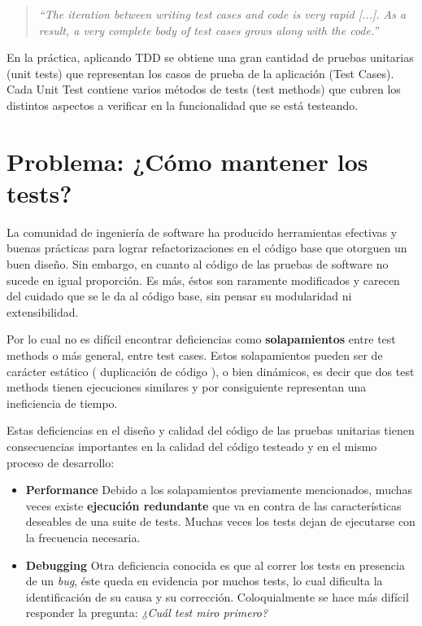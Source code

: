 \begin{quote}
\emph{``The iteration between writing test cases and code is very rapid [...]. As a result, a very complete body of test cases grows along with the code.''}
\end{quote}


\par En la práctica, aplicando TDD se obtiene una gran cantidad de pruebas unitarias (unit tests) que representan los casos de prueba de la aplicación (Test Cases). Cada Unit Test contiene varios métodos de tests (test methods) que cubren los distintos aspectos a verificar en la funcionalidad que se está testeando.


\section{Problema: ¿Cómo mantener los tests?}

\par La comunidad de ingeniería de software ha producido herramientas efectivas y buenas prácticas para lograr refactorizaciones en el código base que otorguen un buen diseño. Sin embargo, en cuanto al código de las pruebas de software no sucede en igual proporción. Es más, éstos son raramente modificados y carecen del cuidado que se le da al código base, sin pensar su modularidad ni extensibilidad. 

\par Por lo cual no es difícil encontrar deficiencias como \textbf{solapamientos} entre test methods o más general, entre test cases. Estos solapamientos pueden ser de carácter estático ( duplicación de código ), o bien dinámicos, es decir que dos test methods tienen ejecuciones similares y por consiguiente representan una ineficiencia de tiempo.

\par Estas deficiencias en el diseño y calidad del código de las pruebas unitarias tienen consecuencias importantes en la calidad del código testeado y en el mismo proceso de desarrollo:
\begin{itemize}
\item \textbf{Performance} Debido a los solapamientos previamente mencionados, muchas veces existe \textbf{ejecución redundante} que va en contra de las características deseables de una suite de tests. Muchas veces los tests dejan de ejecutarse con la frecuencia necesaria.
\item \textbf{Debugging} Otra deficiencia conocida es que al correr los tests en presencia de un \emph{bug}, éste queda en evidencia por muchos tests, lo cual dificulta la identificación de su causa y su corrección. Coloquialmente se hace más difícil responder la pregunta: \emph{¿Cuál test miro primero?}
\end{itemize}
 
